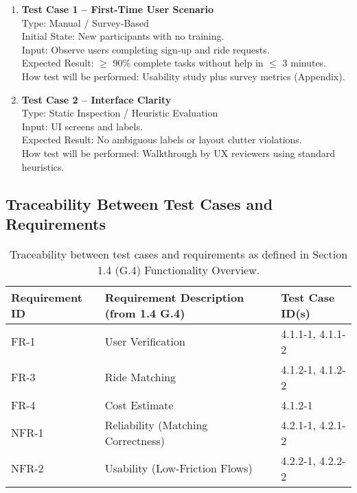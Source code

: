\documentclass[12pt, titlepage]{article}
\begin{document}
\begin{enumerate}
\item \textbf{Test Case 1 – First-Time User Scenario}\\
Type: Manual / Survey-Based\\
Initial State: New participants with no training.\\
Input: Observe users completing sign-up and ride requests.\\
Expected Result: $\geq$ 90\% complete tasks without help in $\leq$ 3 minutes.\\
How test will be performed: Usability study plus survey metrics (Appendix).\\[5pt]

\item \textbf{Test Case 2 – Interface Clarity}\\
Type: Static Inspection / Heuristic Evaluation\\
Input: UI screens and labels.\\
Expected Result: No ambiguous labels or layout clutter violations.\\
How test will be performed: Walkthrough by UX reviewers using standard heuristics.\\
\end{enumerate}

\subsection{Traceability Between Test Cases and Requirements}

\begin{table}[H]
\centering
\begin{tabular}{|l|l|l|}
\hline
\textbf{Requirement ID} & \textbf{Requirement Description (from 1.4 G.4)} & \textbf{Test Case ID(s)} \\ \hline
FR-1 & User Verification & 4.1.1-1, 4.1.1-2 \\ \hline
FR-3 & Ride Matching & 4.1.2-1, 4.1.2-2 \\ \hline
FR-4 & Cost Estimate & 4.1.2-1 \\ \hline
NFR-1 & Reliability (Matching Correctness) & 4.2.1-1, 4.2.1-2 \\ \hline
NFR-2 & Usability (Low-Friction Flows) & 4.2.2-1, 4.2.2-2 \\ \hline
\end{tabular}
\caption{Traceability between test cases and requirements as defined in Section 1.4 (G.4) Functionality Overview.}
\end{table}
\end{document}
